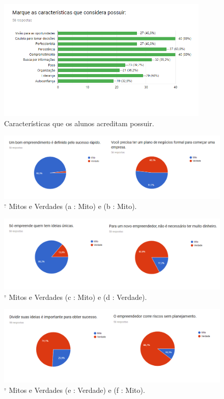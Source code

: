 \begin{figure}[!htb]
    \centering
    \includegraphics[width=0.9\textwidth]{img/habilidades.PNG}
    \caption{Características que os alunos acreditam possuir.}
    \label{fig:caract}
\end{figure}

\begin{figure}[!htb]
    \centering
    \includegraphics[width=1.0\textwidth]{img/mv1-2.png}
    \caption{$^{\underline{\circ}}$ Mitos e Verdades (a : Mito) e (b : Mito).}
    \label{fig:mv1-2}
\end{figure}

\begin{figure}[!htb]
    \centering
    \includegraphics[width=1.0\textwidth]{img/mv3-4.png}
    \caption{$^{\underline{\circ}}$ Mitos e Verdades (c : Mito) e (d : Verdade).}
    \label{fig:mv3-4}
\end{figure}

\begin{figure}[!htb]
    \centering
    \includegraphics[width=1.0\textwidth]{img/mv5-6.png}
    \caption{$^{\underline{\circ}}$ Mitos e Verdades (e : Verdade) e (f : Mito).}
    \label{fig:mv5-6}
\end{figure}


